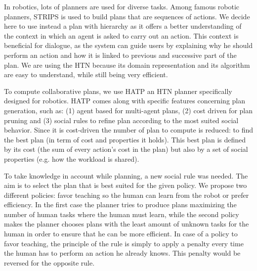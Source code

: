 \documentclass{llncs}
\begin{document}


In robotics, lots of planners are used for diverse tasks. Among famous robotic planners, STRIPS \cite{strips71} is used to build plans that are sequences of actions. We decide here to use instead a plan with hierarchy as it offers a better understanding of the context in which an agent is asked to carry out an action. This context is beneficial for dialogue, as the system can guide users by explaining why he should perform an action and how it is linked to previous and successive part of the plan. 
We are using the HTN because its domain representation and its algorithm are easy to understand, while still being very efficient. 



To compute collaborative plans, we use HATP \cite{lallement14} an HTN planner specifically designed for robotics.
HATP comes along with specific features concerning plan generation, such as: (1) agent based for multi-agent plans, (2) cost driven for plan pruning and (3) social rules to refine plan according to the most suited social behavior.
Since it is cost-driven the number of plan to compute is reduced: to find the best plan (in term of cost and properties it holds). 
This best plan is defined by its cost (the sum of every action's cost in the plan) but also by a set of social properties (e.g. how the workload is shared).

To take knowledge in account while planning, a new social rule was needed. The aim is to select the plan that is best suited for the given policy. We propose two different policies: favor teaching so the human can learn from the robot or prefer efficiency. In the first case the planner tries to produce plans maximizing the number of human tasks where the human must learn, while the second policy makes the planner chooses plans with the least amount of unknown tasks for the human in order to ensure that he can be more efficient.
In case of a policy to favor teaching, the principle of the rule is simply to apply a penalty every time the human has to perform an action he already knows. This penalty would be reversed for the opposite rule.
\end{document}
